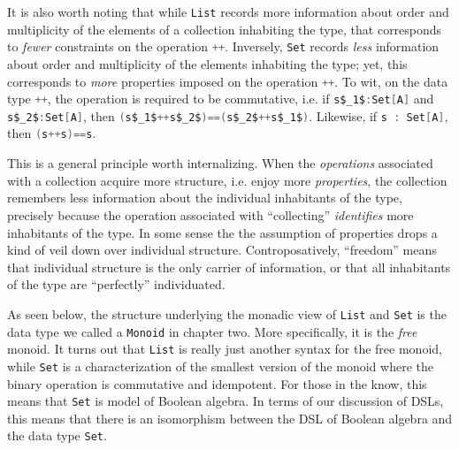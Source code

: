 It is also worth noting that while
\lstinline[language=Scala,mathescape=true]!List! records more
information about order and multiplicity of the elements of a
collection inhabiting the type, that corresponds to \emph{fewer}
constraints on the operation
\lstinline[language=Scala,mathescape=true]!++!. Inversely,
\lstinline[language=Scala,mathescape=true]!Set! records \emph{less}
information about order and multiplicity of the elements inhabiting
the type; yet, this corresponds to \emph{more} properties imposed on
the operation \lstinline[language=Scala,mathescape=true]!++!. To wit,
on the data type \lstinline[language=Scala,mathescape=true]!++!, the
operation is required to be commutative, i.e. if
\lstinline[language=Scala,mathescape=true]!s$_1$:Set[A]! and
\lstinline[language=Scala,mathescape=true]!s$_2$:Set[A]!, then
\lstinline[language=Scala,mathescape=true]!(s$_1$++s$_2$)==(s$_2$++s$_1$)!. Likewise,
if \lstinline[language=Scala,mathescape=true]!s : Set[A]!, then
\lstinline[language=Scala,mathescape=true]!(s++s)==s!.

This is a general principle worth internalizing. When the
\emph{operations} associated with a collection acquire more structure,
i.e. enjoy more \emph{properties}, the collection remembers less
information about the individual inhabitants of the type, precisely
because the operation associated with ``collecting'' \emph{identifies}
more inhabitants of the type. In some sense the the assumption of
properties drops a kind of veil down over individual
structure. Controposatively, ``freedom'' means that individual
structure is the only carrier of information, or that all inhabitants
of the type are ``perfectly'' individuated.

As seen below, the structure underlying the monadic view of
\lstinline[language=Scala,mathescape=true]!List! and
\lstinline[language=Scala,mathescape=true]!Set! is the data type we
called a \lstinline[language=Scala,mathescape=true]!Monoid! in chapter
two. More specifically, it is the \emph{free} monoid. It turns out
that \lstinline[language=Scala,mathescape=true]!List! is really just
another syntax for the free monoid, while
\lstinline[language=Scala,mathescape=true]!Set! is a characterization
of the smallest version of the monoid where the binary operation is
commutative and idempotent. For those in the know, this means that
\lstinline[language=Scala,mathescape=true]!Set! is model of Boolean
algebra. In terms of our discussion of DSLs, this means that there is
an isomorphism between the DSL of Boolean algebra and the data type
\lstinline[language=Scala,mathescape=true]!Set!.


